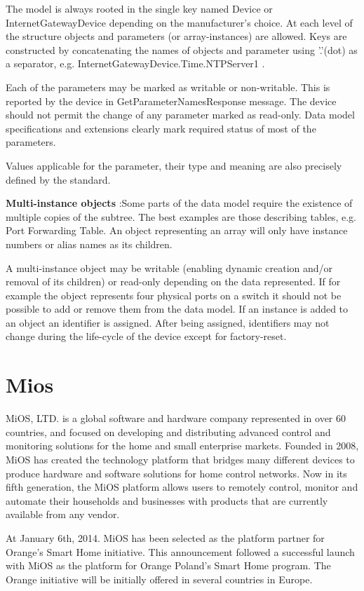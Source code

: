 The model is always rooted in the single key named Device or InternetGatewayDevice depending on the manufacturer's choice. At each level of the structure objects and parameters (or array-instances) are allowed. Keys are constructed by concatenating the names of objects and parameter using '.'(dot) as a separator, e.g. InternetGatewayDevice.Time.NTPServer1 .

Each of the parameters may be marked as writable or non-writable. This is reported by the device in GetParameterNamesResponse message. The device should not permit the change of any parameter marked as read-only. Data model specifications and extensions clearly mark required status of most of the parameters.

Values applicable for the parameter, their type and meaning are also precisely defined by the standard.

\textbf{Multi-instance objects} :Some parts of the data model require the existence of multiple copies of the subtree. The best examples are those describing tables, e.g. Port Forwarding Table. An object representing an array will only have instance numbers or alias names as its children.

A multi-instance object may be writable (enabling dynamic creation and/or removal of its children) or read-only depending on the data represented. If for example the object represents four physical ports on a switch it should not be possible to add or remove them from the data model. If an instance is added to an object an identifier is assigned. After being assigned, identifiers may not change during the life-cycle of the device except for factory-reset.
\section{Mios}
MiOS, LTD. is a global software and hardware company represented in over 60 countries, and focused on developing and distributing advanced control and monitoring solutions for the home and small enterprise markets. Founded in 2008, MiOS has created the technology platform that bridges many different devices to produce hardware and software solutions for home control networks. Now in its fifth generation, the MiOS platform allows users to remotely control, monitor and automate their households and businesses with products that are currently available from any vendor.

At January 6th, 2014. MiOS has been selected as the platform partner for Orange’s Smart Home initiative. This announcement followed a successful launch with MiOS as the platform for Orange Poland’s Smart Home program.  The Orange initiative will be initially offered in several countries in Europe.

